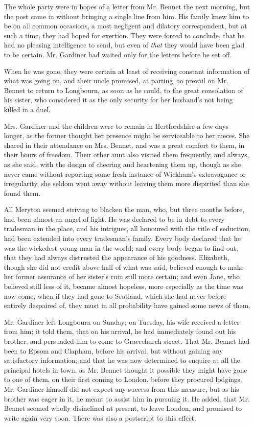 
The whole party were in hopes of a letter from Mr.
Bennet the next morning, but the post came in without
bringing a single line from him. His family knew him to
be on all common occasions, a most negligent and dilatory
correspondent, but at such a time, they had hoped for
exertion. They were forced to conclude, that he had no
pleasing intelligence to send, but even of \textit{that} they would
have been glad to be certain. Mr. Gardiner had waited
only for the letters before he set off.

When he was gone, they were certain at least of receiving
constant information of what was going on, and their
uncle promised, at parting, to prevail on Mr. Bennet to
return to Longbourn, as soon as he could, to the great
consolation of his sister, who considered it as the only
security for her husband’s not being killed in a duel.

Mrs. Gardiner and the children were to remain in Hertfordshire
a few days longer, as the former thought her
presence might be serviceable to her nieces. She shared
in their attendance on Mrs. Bennet, and was a great
comfort to them, in their hours of freedom. Their other
aunt also visited them frequently, and always, as she said,
with the design of cheering and heartening them up,
though as she never came without reporting some fresh
instance of Wickham’s extravagance or irregularity, she
seldom went away without leaving them more dispirited
than she found them.

All Meryton seemed striving to blacken the man, who,
but three months before, had been almost an angel of
light. He was declared to be in debt to every tradesman
in the place, and his intrigues, all honoured with the title
of seduction, had been extended into every tradesman’s
family. Every body declared that he was the wickedest
young man in the world; and every body began to find
out, that they had always distrusted the appearance of
his goodness. Elizabeth, though she did not credit above
half of what was said, believed enough to make her former
assurance of her sister’s ruin still more certain; and even
Jane, who believed still less of it, became almost hopeless,
more especially as the time was now come, when if they
had gone to Scotland, which she had never before entirely
despaired of, they must in all probability have gained
some news of them.

Mr. Gardiner left Longbourn on Sunday; on Tuesday,
his wife received a letter from him; it told them, that
on his arrival, he had immediately found out his brother,
and persuaded him to come to Gracechurch street. That
Mr. Bennet had been to Epsom and Clapham, before his
arrival, but without gaining any satisfactory information;
and that he was now determined to enquire at all the
principal hotels in town, as Mr. Bennet thought it possible
they might have gone to one of them, on their first coming
to London, before they procured lodgings. Mr. Gardiner
himself did not expect any success from this measure,
but as his brother was eager in it, he meant to assist him
in pursuing it. He added, that Mr. Bennet seemed wholly
disinclined at present, to leave London, and promised to
write again very soon. There was also a postscript to this
effect.

